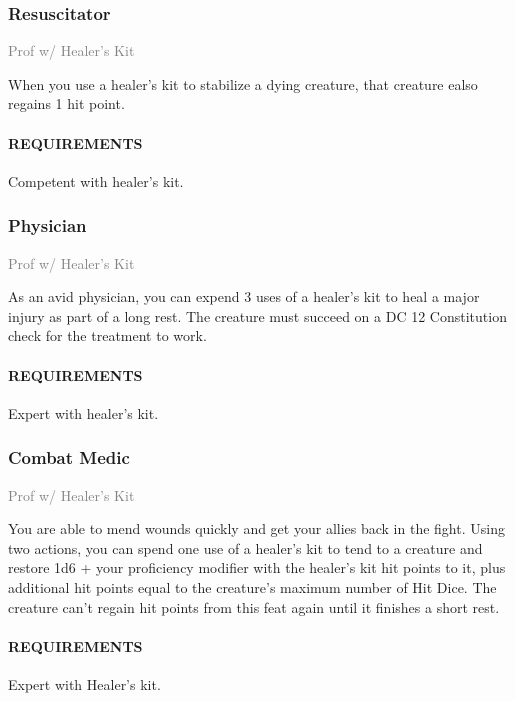     \subsubsection{Resuscitator} \label{feat::resuscitator}
    \small{\textcolor{gray}{Prof w/ Healer's Kit}}

    \normalsize
    When you use a healer's kit to stabilize a dying creature, that creature ealso regains 1 hit point.
    \paragraph{REQUIREMENTS} Competent with healer's kit.

    \subsubsection{Physician} \label{feat::physician}
    \small{\textcolor{gray}{Prof w/ Healer's Kit}}

    \normalsize
    As an avid physician, you can expend 3 uses of a healer's kit to heal a major injury as part of a long rest.
    The creature must succeed on a DC 12 Constitution check for the treatment to work.
    \paragraph{REQUIREMENTS} Expert with healer's kit.

    \subsubsection{Combat Medic} \label{feat::combatmedic}
    \small{\textcolor{gray}{Prof w/ Healer's Kit}}

    \normalsize
    You are able to mend wounds quickly and get your allies back in the fight.
    Using two actions, you can spend one use of a healer's kit to tend to a creature and restore 1d6 + your proficiency modifier with the healer's kit hit points to it, plus additional hit points equal to the creature's maximum number of Hit Dice.
    The creature can't regain hit points from this feat again until it finishes a short rest.
    \paragraph{REQUIREMENTS} Expert with Healer's kit.


